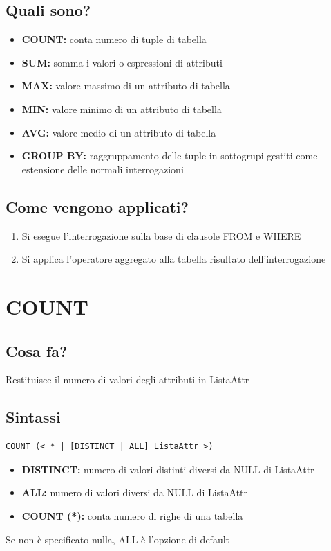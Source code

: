 \subsection{Quali sono?}
\begin{itemize}
    \item \textbf{COUNT:} conta numero di tuple di tabella
    \item \textbf{SUM:} somma i valori o espressioni di attributi
    \item \textbf{MAX:} valore massimo di un attributo di tabella
    \item \textbf{MIN:} valore minimo di un attributo di tabella
    \item \textbf{AVG:} valore medio di un attributo di tabella
    \item \textbf{GROUP BY:} raggruppamento delle tuple in sottogrupi gestiti come estensione delle normali interrogazioni
\end{itemize}
\subsection{Come vengono applicati?}
\begin{enumerate}
    \item Si esegue l'interrogazione sulla base di clausole FROM e WHERE
    \item Si applica l'operatore aggregato alla tabella risultato dell'interrogazione
\end{enumerate}

\section{COUNT}
\subsection{Cosa fa?}
Restituisce il numero di valori degli attributi in ListaAttr
\subsection{Sintassi}
\begin{lstlisting}[language=sql_generic]
COUNT (< * | [DISTINCT | ALL] ListaAttr >)
\end{lstlisting}
\begin{itemize}
    \item \textbf{DISTINCT:} numero di valori distinti diversi da NULL di ListaAttr
    \item \textbf{ALL:} numero di valori diversi da NULL di ListaAttr
    \item \textbf{COUNT (*):} conta numero di righe di una tabella
\end{itemize}
Se non è specificato nulla, ALL è l'opzione di default

